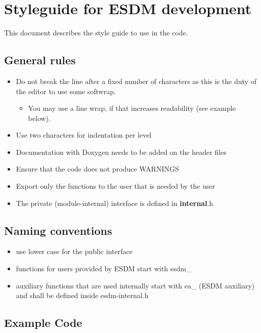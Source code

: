 \section{Styleguide for ESDM development}%
\label{styleguide-for-esdm-development}

This document describes the style guide to use in the code.

\subsection{General rules}\label{general-rules}

\begin{itemize}
  \item Do not break the line after a fixed number of characters as this is the duty of the editor to use some softwrap.
    \begin{itemize}
      \item You may use a line wrap, if that increases readability (see example below).
    \end{itemize}
  \item Use two characters for indentation per level
  \item Documentation with Doxygen needs to be added on the header files
  \item Ensure that the code does not produce WARNINGS
  \item Export only the functions to the user that is needed by the user
  \item The private (module-internal) interface is defined in \textbf{internal}.h
\end{itemize}

\subsection{Naming conventions}\label{naming-conventions}

\begin{itemize}
  \item use lower case for the public interface
  \item functions for users provided by ESDM start with esdm\_
  \item auxiliary functions that are used internally start with ea\_ (ESDM auxiliary) and shall be defined inside esdm-internal.h
\end{itemize}

\subsection{Example Code}\label{example-code}

